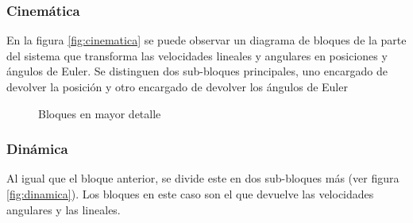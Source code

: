 \documentclass[main]{subfiles}
\begin{document}
\subsubsection{Cinem\'atica}

En la figura \ref{fig:cinematica} se puede observar un diagrama de bloques de la parte del sistema que transforma las velocidades lineales y angulares en posiciones y \'angulos de Euler. Se distinguen dos sub-bloques principales, uno encargado de devolver la  posici\'on y otro encargado de devolver los \'angulos de Euler
\begin{figure} [h!]
  \centering
  \caption{Bloques en mayor detalle}
  \label{fig:bloques}
\end{figure}



\subsubsection{Din\'amica}

Al igual que el bloque anterior, se divide este en dos sub-bloques m\'as (ver figura \ref{fig:dinamica}). Los bloques en este caso son el que devuelve las velocidades angulares y las lineales. 
\end{document}
